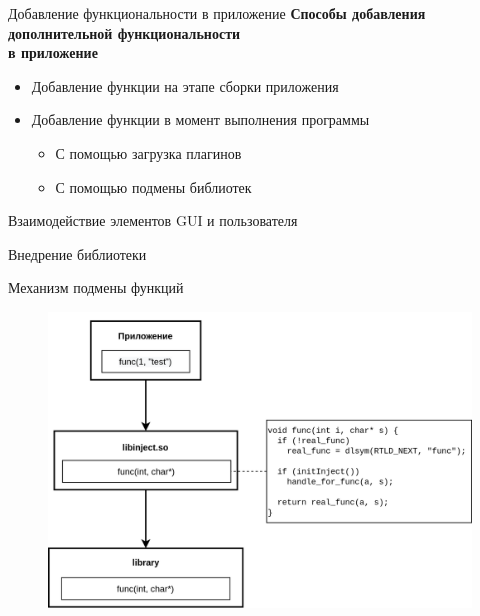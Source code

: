 \documentclass[aspectratio=1610]{beamer}
\begin{document}
\begin{frame}{Добавление функциональности в приложение}
	\textbf{Способы добавления дополнительной функциональности\\в приложение}
	\begin{itemize}
		\item Добавление функции на этапе сборки приложения
		\item Добавление функции в момент выполнения программы
		\begin{itemize}
			\item С помощью загрузка плагинов
			\item С помощью подмены библиотек
		\end{itemize}
	\end{itemize}
\end{frame}

\begin{frame}{Взаимодействие элементов GUI и пользователя}
	\begin{figure}
		
	\end{figure}
\end{frame}

\begin{frame}{Внедрение библиотеки}
	\begin{figure}
		
	\end{figure}
\end{frame}

\begin{frame}{Механизм подмены функций}
	\begin{figure}
		\includegraphics[height=0.8\textheight]{inject}
	\end{figure}
\end{frame}
\end{document}
